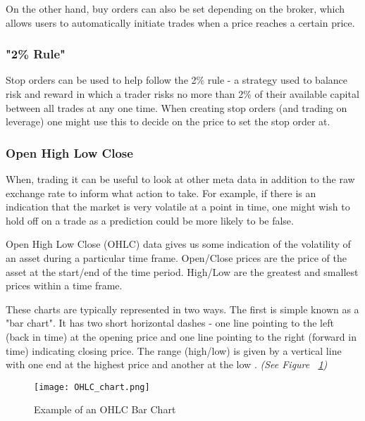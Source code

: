             On the other hand, buy orders can also be set depending on the broker, which allows users to automatically initiate trades when a price reaches a certain price.


            \subsubsection{"2\% Rule"}
            Stop orders can be used to help follow the 2\% rule - a strategy used to balance risk and reward in which a trader risks no more than 2\% of their available capital between all trades at any one time. When creating stop orders (and trading on leverage) one might use this to decide on the price to set the stop order at. \cite{staff_2017}

            
            \subsubsection{Open High Low Close}

            When, trading it can be useful to look at other meta data in addition to the raw exchange rate to inform what action to take. For example, if there is an indication that the market is very volatile at a point in time, one might wish to hold off on a trade as a prediction could be more likely to be false. 
            
            Open High Low Close (OHLC) data gives us some indication of the volatility of an asset during a particular time frame. Open/Close prices are the price of the asset at the start/end of the time period. High/Low are the greatest and smallest prices within a time frame. \cite{investopedia_OHLC}

            These charts are typically represented in two ways. The first is simple known as a "bar chart". It has two short horizontal dashes - one line pointing to the left (back in time) at the opening price and one line pointing to the right (forward in time) indicating closing price. The range (high/low) is given by a vertical line with one end at the highest price and another at the low \cite{barchart_OHLC}. \textit{(See Figure ~\ref{fig:barchart_ex})}

            \begin{figure}[htbp]
                \centering
                \texttt{[image: OHLC\_chart.png]}
                \caption{Example of an OHLC Bar Chart \cite{barchart_OHLC}}
                \label{fig:barchart_ex}
            \end{figure}

